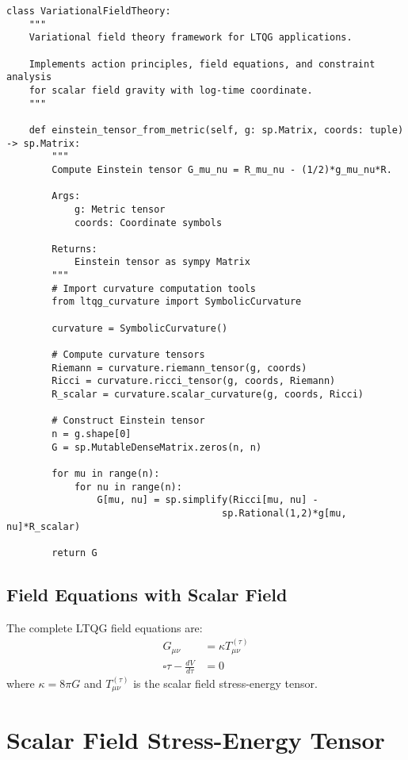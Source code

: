 \documentclass[11pt,a4paper]{article}
\theoremstyle{definition}
\theoremstyle{remark}
\newcommand{\dAlem}{\square}
\begin{document}
\begin{lstlisting}
class VariationalFieldTheory:
    """
    Variational field theory framework for LTQG applications.
    
    Implements action principles, field equations, and constraint analysis
    for scalar field gravity with log-time coordinate.
    """
    
    def einstein_tensor_from_metric(self, g: sp.Matrix, coords: tuple) -> sp.Matrix:
        """
        Compute Einstein tensor G_mu_nu = R_mu_nu - (1/2)*g_mu_nu*R.
        
        Args:
            g: Metric tensor
            coords: Coordinate symbols
            
        Returns:
            Einstein tensor as sympy Matrix
        """
        # Import curvature computation tools
        from ltqg_curvature import SymbolicCurvature
        
        curvature = SymbolicCurvature()
        
        # Compute curvature tensors
        Riemann = curvature.riemann_tensor(g, coords)
        Ricci = curvature.ricci_tensor(g, coords, Riemann)
        R_scalar = curvature.scalar_curvature(g, coords, Ricci)
        
        # Construct Einstein tensor
        n = g.shape[0]
        G = sp.MutableDenseMatrix.zeros(n, n)
        
        for mu in range(n):
            for nu in range(n):
                G[mu, nu] = sp.simplify(Ricci[mu, nu] - 
                                      sp.Rational(1,2)*g[mu, nu]*R_scalar)
        
        return G
\end{lstlisting}

\subsection{Field Equations with Scalar Field}

The complete LTQG field equations are:
\begin{align}
G_{\mu\nu} &= \kappa T_{\mu\nu}^{(\tau)} \label{eq:einstein}\\
\dAlem \tau - \frac{dV}{d\tau} &= 0 \label{eq:scalar_field}
\end{align}
where $\kappa = 8\pi G$ and $T_{\mu\nu}^{(\tau)}$ is the scalar field stress-energy tensor.

\section{Scalar Field Stress-Energy Tensor}
\end{document}
